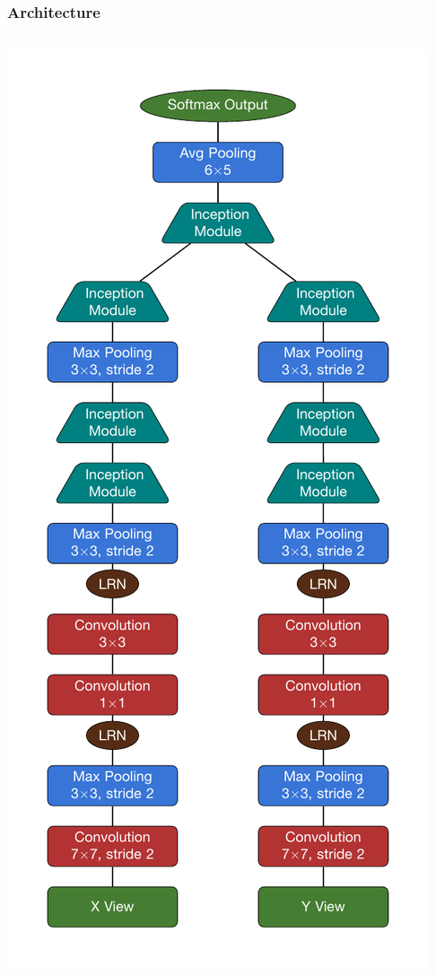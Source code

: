 \documentclass[10pt,professionalfonts,xcolor=table]{beamer}
\begin{document}
\begin{frame}

\frametitle{Architecture}

  \begin{columns}
   \includegraphics[height=0.9\textheight]{figures/arch/arch.pdf}

\end{columns}
\end{frame}
\end{document}
